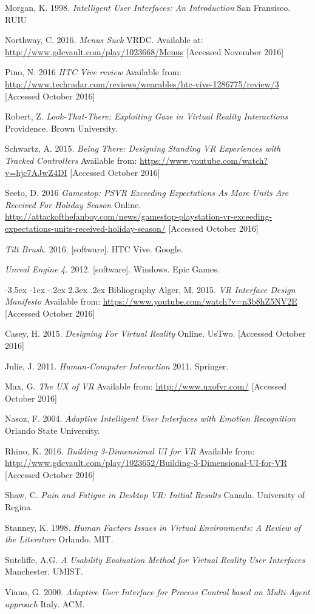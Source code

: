 \documentclass[9pt,twocolumn]{article}
\makeatletter
\renewcommand{\section}{\@startsection {section}{1}{\z@}%
             {-3.5ex \@plus -1ex \@minus -.2ex}%
             {2.3ex \@plus .2ex}%
             {\normalfont\Large\scshape\bfseries}}
\makeatother
\begin{document}
Morgan, K. 1998. \emph{Intelligent User Interfaces: An Introduction} San Fransisco. RUIU 

Northway, C. 2016. \emph{Menus Suck} VRDC. Available at: \url{http://www.gdcvault.com/play/1023668/Menus} [Accessed November 2016]

Pino, N. 2016 \emph{HTC Vive review} Available from: \url{http://www.techradar.com/reviews/wearables/htc-vive-1286775/review/3} [Accessed October 2016]

Robert, Z. \emph{Look-That-There: Exploiting Gaze in Virtual Reality Interactions} Providence. Brown University. 

Schwartz, A. 2015. \emph{Being There: Designing Standing VR Experiences with Tracked Controllers} Available from: \url{https://www.youtube.com/watch?v=hjc7AJwZ4DI} [Accessed October 2016]
	
Seeto, D. 2016 \emph{Gamestop: PSVR Exceeding Expectations As More Units Are Received For Holiday Season} Online. \url{http://attackofthefanboy.com/news/gamestop-playstation-vr-exceeding-expectations-units-received-holiday-season/} [Accessed October 2016]

\emph{Tilt Brush.} 2016. [software]. HTC Vive. Google. 

\emph{Unreal Engine 4.} 2012. [software]. Windows. Epic Games. 


\section{Bibliography}
Alger, M. 2015. \emph{VR Interface Design Manifesto} Available from: \url{https://www.youtube.com/watch?v=n3b8hZ5NV2E} [Accessed October 2016]

Casey, H. 2015. \emph{Designing For Virtual Reality} Online. UsTwo. [Accessed October 2016]

Julie, J. 2011. \emph{Human-Computer Interaction} 2011. Springer. 

Max, G. \emph{The UX of VR} Available from: \url{http://www.uxofvr.com/} [Accessed October 2016]

Nasoz, F. 2004. \emph{Adaptive Intelligent User Interfaces with Emotion Recognition} Orlando State University. 

Rhino, K. 2016. \emph{Building 3-Dimensional UI for VR} Available from: \url{http://www.gdcvault.com/play/1023652/Building-3-Dimensional-UI-for-VR} [Accessed October 2016]

Shaw, C. \emph{Pain and Fatigue in Desktop VR: Initial Results} Canada. University of Regina. 

Stanney, K. 1998. \emph{Human Factors Issues in Virtual Environments: A Review of the Literature} Orlando. MIT. 

Sutcliffe, A.G. \emph{A Usability Evaluation Method for Virtual Reality User Interfaces} Manchester. UMIST. 

Viano, G. 2000. \emph{Adaptive User Interface for Process Control based on Multi-Agent approach} Italy. ACM. 
\end{document}
